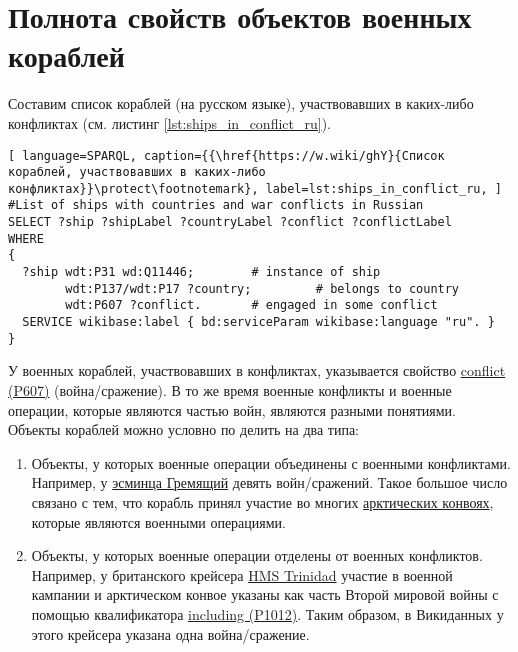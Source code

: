 \label{question:ship_1}


\section{Полнота свойств объектов военных кораблей}

Составим список кораблей (на русском языке), участвовавших в каких-либо конфликтах (см. листинг \ref{lst:ships_in_conflict_ru}).

\begin{lstlisting}[ language=SPARQL, caption={{\href{https://w.wiki/ghY}{Список кораблей, участвовавших в каких-либо конфликтах}}\protect\footnotemark}, label=lst:ships_in_conflict_ru, ]
#List of ships with countries and war conflicts in Russian
SELECT ?ship ?shipLabel ?countryLabel ?conflict ?conflictLabel
WHERE
{
  ?ship wdt:P31 wd:Q11446;        # instance of ship
        wdt:P137/wdt:P17 ?country;         # belongs to country
        wdt:P607 ?conflict.       # engaged in some conflict
  SERVICE wikibase:label { bd:serviceParam wikibase:language "ru". }
}
\end{lstlisting}

У военных кораблей, участвовавших в конфликтах, указывается свойство \href{https://www.wikidata.org/wiki/Property:P607}{conflict (P607)} (война/сражение). В то же время военные конфликты и военные операции, которые являются частью войн, являются разными понятиями. Объекты кораблей можно условно по делить на два типа:

\begin{enumerate}
  \item Объекты, у которых военные операции объединены с военными конфликтами. Например, у \href{https://www.wikidata.org/wiki/Q4148613}{эсминца Гремящий} девять войн/сражений. Такое большое число связано с тем, что корабль принял участие во многих \href{https://ru.wikipedia.org/wiki/Арктические_конвои}{арктических конвоях}, которые являются военными операциями.
  \item Объекты, у которых военные операции отделены от военных конфликтов. Например, у британского крейсера \href{https://ru.wikipedia.org/wiki/HMS_Trinidad_(1940)}{HMS Trinidad} участие в военной кампании и арктическом конвое указаны как часть Второй мировой войны с помощью квалификатора \href{https://www.wikidata.org/wiki/Property:P1012}{including (P1012)}. Таким образом, в Викиданных у этого крейсера указана одна война/сражение.
\end{enumerate}

